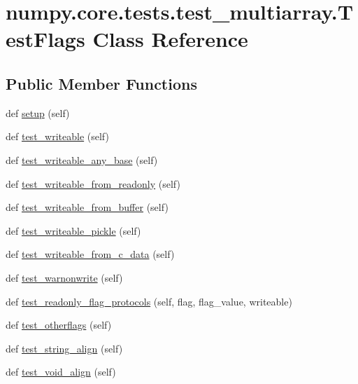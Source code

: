 \hypertarget{classnumpy_1_1core_1_1tests_1_1test__multiarray_1_1TestFlags}{}\section{numpy.\+core.\+tests.\+test\+\_\+multiarray.\+Test\+Flags Class Reference}
\label{classnumpy_1_1core_1_1tests_1_1test__multiarray_1_1TestFlags}
\subsection*{Public Member Functions}
\begin{DoxyCompactItemize}
\item 
def \hyperlink{classnumpy_1_1core_1_1tests_1_1test__multiarray_1_1TestFlags_afee0b6cabffb042654de61851282c26a}{setup} (self)
\item 
def \hyperlink{classnumpy_1_1core_1_1tests_1_1test__multiarray_1_1TestFlags_adaae81d6ad21b9ce6af04866cdd79243}{test\+\_\+writeable} (self)
\item 
def \hyperlink{classnumpy_1_1core_1_1tests_1_1test__multiarray_1_1TestFlags_a08464179d1c04ea3c90cf9af4db56bd5}{test\+\_\+writeable\+\_\+any\+\_\+base} (self)
\item 
def \hyperlink{classnumpy_1_1core_1_1tests_1_1test__multiarray_1_1TestFlags_a065b976e08b7357d3e5ed2499a31cc74}{test\+\_\+writeable\+\_\+from\+\_\+readonly} (self)
\item 
def \hyperlink{classnumpy_1_1core_1_1tests_1_1test__multiarray_1_1TestFlags_a59da6b94c44b9ea4e997599c0f674ad7}{test\+\_\+writeable\+\_\+from\+\_\+buffer} (self)
\item 
def \hyperlink{classnumpy_1_1core_1_1tests_1_1test__multiarray_1_1TestFlags_a1ebc2bc7c99f652fe28732b662bac2b5}{test\+\_\+writeable\+\_\+pickle} (self)
\item 
def \hyperlink{classnumpy_1_1core_1_1tests_1_1test__multiarray_1_1TestFlags_a380a77c24c926a0a22d015cc79d57142}{test\+\_\+writeable\+\_\+from\+\_\+c\+\_\+data} (self)
\item 
def \hyperlink{classnumpy_1_1core_1_1tests_1_1test__multiarray_1_1TestFlags_ad6f470695e80e54705cd612f4b2c8aca}{test\+\_\+warnonwrite} (self)
\item 
def \hyperlink{classnumpy_1_1core_1_1tests_1_1test__multiarray_1_1TestFlags_abb5e75f313002fba26e643024c085c8a}{test\+\_\+readonly\+\_\+flag\+\_\+protocols} (self, flag, flag\+\_\+value, writeable)
\item 
def \hyperlink{classnumpy_1_1core_1_1tests_1_1test__multiarray_1_1TestFlags_a6cee69e34dddc4e946249ce2e17cdf2a}{test\+\_\+otherflags} (self)
\item 
def \hyperlink{classnumpy_1_1core_1_1tests_1_1test__multiarray_1_1TestFlags_a764b1f634a170ac5acf3f1f89c5df394}{test\+\_\+string\+\_\+align} (self)
\item 
def \hyperlink{classnumpy_1_1core_1_1tests_1_1test__multiarray_1_1TestFlags_a1ed09323b4e58d37529600eae32d85e6}{test\+\_\+void\+\_\+align} (self)
\end{DoxyCompactItemize}
